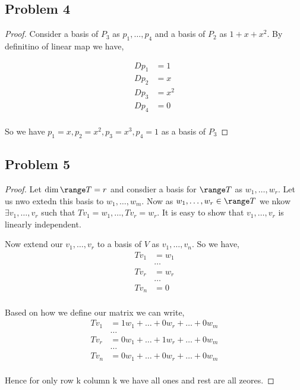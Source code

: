 \documentclass[a4paper]{report}
\begin{document}
\subsection*{Problem 4}
\begin{proof}
    Consider a basis of $P_3$ as $p_1,\dots,p_4$ and a basis of $P_2$ as $1 + x + x^2$. By definitino of linear map we have, 

    \begin{align*}
        Dp_1 &= 1 \\
        Dp_2 &= x\\
        Dp_3 &= x^2\\
        Dp_4 &= 0 \\
    \end{align*}

    So we have $p_1 = x, p_2 = x^2, p_3 = x^{3}, p_4 = 1$ as a basis of $P_3$


\end{proof}
\subsection*{Problem 5}
\begin{proof}
    Let $\dim \range T = r$ and consdier a basis for $\range T$ as $w_1,\dots,w_r$. Let us nwo extedn this basis to $w_1,\dots,w_m$. Now as $w_1,\dots,w_r \in \range T$  we nkow $\exists v_1,\dots,v_r$ such that $Tv_1 = w_1,\dots,Tv_r = w_r$. It is easy to show that $v_1,\dots,v_r$ is linearly independent.

    Now extend our $v_1,\dots,v_r$ to a basis of $V$ as $v_1,\dots,v_n$. So we have, 
    \begin{align*}
        Tv_1 &= w_1\\
             &\dots\\
        Tv_r &= w_r\\
             &\dots \\
        Tv_n &= 0\\
    \end{align*}

    Based on how we define our matrix we can write, 
    \begin{align*}
        Tv_1 &= 1w_1 + \dots + 0w_r + \dots + 0w_m\\
        & \dots\\
        Tv_r &= 0w_1 + \dots + 1w_r + \dots + 0w_m\\
        & \dots\\
        Tv_n &= 0w_1 + \dots + 0w_r + \dots + 0w_m\\
    \end{align*}

    Hence for only row k column k we have all ones and rest are all zeores.

\end{proof}
\end{document}
